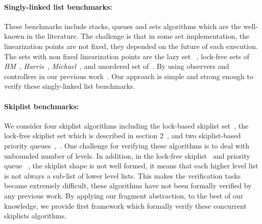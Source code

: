 \paragraph{Singly-linked list benchmarks:} These benchmarks include stacks, queues and sets algorithms which are the well-known in the literature. The challenge is that in some set implementation, the linearization points are not fixed, they depended on the future of each execution. The sets with non fixed linearization points are the lazy set ~\cite{Lazyset}, lock-free sets of {\it HM}~\cite{ArtOfMpP}, {\it Harris}~\cite{Harris:list}, {\it Michael}~\cite{Michael:list}, and unordered set of~\cite{Zhang:unorderedlist}. By using observers and controllers in our previous work~\cite{Quy:sas16}. Our approach is simple and strong enough to verify these singly-linked list benchmarks.


\paragraph{Skiplist benchmarks:} We consider four skiplist algorithms including the lock-based skiplist set~\cite{MS:QueueAlgorithms}, the lock-free skiplist set which is described in section 2~\cite{ArtOfMpP}, and two skiplist-based priority queues~\cite{Linden:opodis13},~\cite{Shavit:queue}. One challenge for verifying these algorithms is to deal with unbounded number of levels. In addition, in the lock-free skiplist~\cite{ArtOfMpP} and priority queue ~\cite{Linden:opodis13}, the skiplist shape is not well formed, it means that each higher level list is not always a sub-list of lower level lists. This makes the verification tasks became extremely difficult, these algorithms have not been formally verified by any previous work. By applying our fragment abstraction,  to the best of our knowledge, we provide first framework which formally verify these concurrent skiplists algorithms. 

